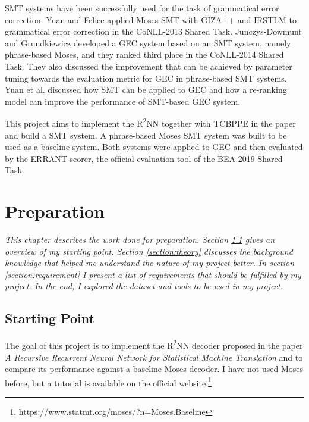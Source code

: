 \documentclass[12pt,a4paper,twoside,openright]{report}
\begin{document}
SMT systems have been successfully used for the task of grammatical error correction. Yuan and Felice\cite{yuan-felice-2013-constrained} applied Moses SMT with GIZA++ and IRSTLM to grammatical error correction in the CoNLL-2013 Shared Task\cite{ng-etal-2013-conll}. Junczys-Dowmunt and Grundkiewicz\cite{junczys-dowmunt-grundkiewicz-2014-amu} developed a GEC system based on an SMT system, namely phrase-based Moses\cite{moses}, and they ranked third place in the CoNLL-2014 Shared Task\cite{ng-etal-2014-conll}. They also discussed the improvement that can be achieved by parameter tuning towards the evaluation metric for GEC in phrase-based SMT systems\cite{junczys-dowmunt-grundkiewicz-2016-phrase}. Yuan et al.\cite{yuan-etal-2016-candidate} discussed how SMT can be applied to GEC and how a re-ranking model can improve the performance of SMT-based GEC system. 

This project aims to implement the R\textsuperscript{2}NN together with TCBPPE in the paper\cite{r2nn} and build a SMT system. A phrase-based Moses SMT system\cite{moses} was built to be used as a baseline system. Both systems were applied to GEC and then evaluated by the ERRANT scorer\cite{bryant-etal-2017-automatic}\cite{felice-etal-2016-automatic}, the official evaluation tool of the BEA 2019 Shared Task\cite{bryant-etal-2019-bea}.


\chapter{Preparation}
\textit{This chapter describes the work done for preparation. Section \ref{section:start} gives an overview of my starting point. Section \ref{section:theory} discusses the background knowledge that helped me understand the nature of my project better. In section \ref{section:requirement} I present a list of requirements that should be fulfilled by my project. In the end, I explored the dataset and tools to be used in my project.}

\section{Starting Point}\label{section:start}

The goal of this project is to implement the R\textsuperscript{2}NN decoder proposed in the paper \textit{A Recursive Recurrent Neural Network for Statistical Machine Translation}\cite{r2nn} and to compare its performance against a baseline Moses decoder. I have not used Moses\cite{moses} before, but a tutorial is available on the official website.\footnote{https://www.statmt.org/moses/?n=Moses.Baseline}
\end{document}
